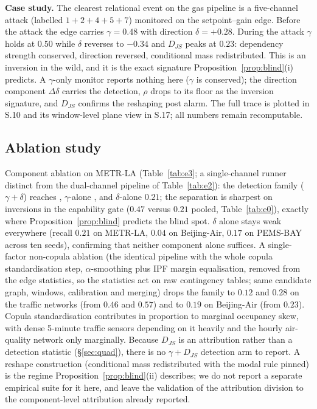 \documentclass[11pt,a4paper]{article}
\begin{document}
\textbf{Case study.} The clearest relational event on the gas pipeline is a
five-channel attack (labelled $1{+}2{+}4{+}5{+}7$) monitored on the
setpoint--gain edge. Before the attack the edge carries $\gamma=0.48$
with direction $\delta=+0.28$. During the attack $\gamma$ holds at $0.50$ while
$\delta$ reverses to $-0.34$ and $D_{JS}$ peaks at $0.23$: dependency strength
conserved, direction reversed, conditional mass redistributed. This is an
inversion in the wild, and it is the exact signature Proposition~\ref{prop:blind}(i)
predicts. A $\gamma$-only monitor reports nothing here ($\gamma$ is conserved); the
direction component $\Delta\delta$ carries the detection, $\rho$ drops to
its floor as the inversion signature, and $D_{JS}$ confirms the reshaping
post alarm. The full trace is plotted in S.10 and its window-level plane view in
S.17; all numbers remain recomputable.
\subsection{Ablation study}\label{sec:ablation}


Component ablation on METR-LA (Table~\ref{tab:e3}; a single-channel
runner distinct from the dual-channel pipeline of Table~\ref{tab:e2}): the detection
family ($\gamma+\delta$) reaches \eThreeGammaDelta{}, $\gamma$-alone
\eThreeGamma{}, and $\delta$-alone $0.21$; the separation is sharpest on
inversions in the capability gate ($0.47$ versus $0.21$ pooled,
Table~\ref{tab:e0}), exactly where Proposition~\ref{prop:blind} predicts
the blind spot. $\delta$ alone stays weak everywhere
(recall $0.21$ on METR-LA, $0.04$ on Beijing-Air, $0.17$ on PEMS-BAY
across ten seeds), confirming that neither component alone suffices. A single-factor non-copula ablation (the identical pipeline with the whole
copula standardisation step, $\alpha$-smoothing plus IPF margin
equalisation, removed from the edge statistics, so the statistics act on
raw contingency tables; same candidate graph, windows, calibration and
merging) drops the
family to $0.12$ and $0.28$ on the traffic networks (from $0.46$ and
$0.57$) and to $0.19$ on Beijing-Air (from $0.23$). Copula
standardisation contributes in proportion to marginal occupancy skew,
with dense 5-minute traffic sensors depending on it heavily and the
hourly air-quality network only marginally. Because $D_{JS}$ is an attribution rather than a
detection statistic (\S\ref{sec:quad}), there is no $\gamma{+}D_{JS}$ detection arm to report. A reshape construction (conditional mass redistributed with the modal
rule pinned) is the regime Proposition~\ref{prop:blind}(ii) describes;
we do not report a separate empirical suite for it here, and leave the
validation of the attribution division to the component-level attribution
already reported.
\end{document}
